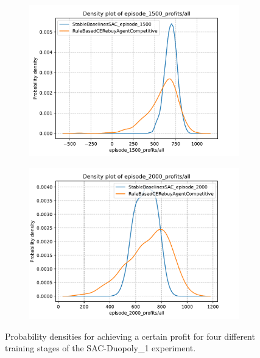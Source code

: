 \begin{figure}[t]
\begin{subfigure}{0.49\textwidth}
		\label{fig:SACDuopolyProfitsDensity2}
	\end{subfigure}
	\begin{subfigure}{0.49\textwidth}
		\centering
		\includegraphics[width = \textwidth]{images/experiments/SACDuopoly/SACDuopolyProfitsDensity3.pdf}\\
		\label{fig:SACDuopolyProfitsDensity3}
	\end{subfigure}
	\begin{subfigure}{0.49\textwidth}
		\centering
		\includegraphics[width = \textwidth]{images/experiments/SACDuopoly/SACDuopolyProfitsDensity4.pdf}\\
		\label{fig:SACDuopolyProfitsDensity4}
	\end{subfigure}
	\caption{Probability densities for achieving a certain profit for four different training stages of the SAC-Duopoly\_1 experiment.}\label{fig:SACDuopolyProfitsDensity}
\end{figure}

